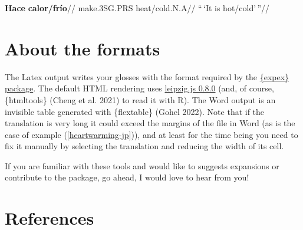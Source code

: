 \documentclass[
  letterpaper,
  DIV=11,
  numbers=noendperiod]{scrartcl}
\begin{document}

\ex\label{formatted} \begingl \gla \textbf{Hace} \textbf{calor/frío}//
\glb make.3SG.PRS heat/cold.N.A// \glft ``\,`It is hot/cold'\,''//
\endgl \xe

\hypertarget{about-the-formats}{%
\section{About the formats}\label{about-the-formats}}

The Latex output writes your glosses with the format required by the
\href{https://ctan.org/pkg/expex?lang=en}{\{expex\} package}. The
default HTML rendering uses
\href{https://github.com/bdchauvette/leipzig.js/}{leipzig.js 0.8.0}
(and, of course, \{htmltools\} (Cheng et al. 2021) to read it with R).
The Word output is an invisible table generated with \{flextable\}
(Gohel 2022). Note that if the translation is very long it could exceed
the margins of the file in Word (as is the case of example
(\ref{heartwarming-jp})), and at least for the time being you need to
fix it manually by selecting the translation and reducing the width of
its cell.

If you are familiar with these tools and would like to suggests
expansions or contribute to the package, go ahead, I would love to hear
from you!

\hypertarget{references}{%
\section*{References}\label{references}}
\end{document}
